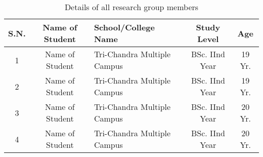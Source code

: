 \begin{table}[H]
\centering
\renewcommand{\arraystretch}{1.5}
\caption{Details of all research group members}
\begin{tabularx}{\textwidth}{|c|c|X|c|c|}
\hline
\textbf{S.N.} & \textbf{Name of Student} & \textbf{School/College Name} & \textbf{Study Level} & \textbf{Age} \\
\hline
1 & Name of Student & Tri-Chandra Multiple Campus & BSc. IInd Year & 19 Yr. \\
\hline
2 & Name of Student & Tri-Chandra Multiple Campus & BSc. IInd Year & 19 Yr. \\
\hline
3 & Name of Student & Tri-Chandra Multiple Campus & BSc. IInd Year & 20 Yr. \\
\hline
4 & Name of Student & Tri-Chandra Multiple Campus & BSc. IInd Year & 20 Yr. \\
\hline
\end{tabularx}
\end{table}